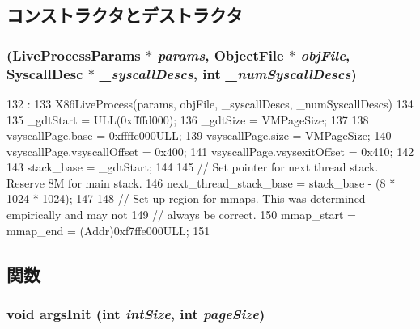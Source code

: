\subsection{コンストラクタとデストラクタ}
\hypertarget{classX86ISA_1_1I386LiveProcess_a6556f426be989188ef0a961836b3b490}{
\subsubsection[{I386LiveProcess}]{ (LiveProcessParams $\ast$ {\em params}, \/  {\bf ObjectFile} $\ast$ {\em objFile}, \/  {\bf SyscallDesc} $\ast$ {\em \_\-syscallDescs}, \/  int {\em \_\-numSyscallDescs})}}
\label{classX86ISA_1_1I386LiveProcess_a6556f426be989188ef0a961836b3b490}



\begin{DoxyCode}
132                               :
133     X86LiveProcess(params, objFile, _syscallDescs, _numSyscallDescs)
134 {
135     _gdtStart = ULL(0xffffd000);
136     _gdtSize = VMPageSize;
137 
138     vsyscallPage.base = 0xffffe000ULL;
139     vsyscallPage.size = VMPageSize;
140     vsyscallPage.vsyscallOffset = 0x400;
141     vsyscallPage.vsysexitOffset = 0x410;
142 
143     stack_base = _gdtStart;
144 
145     // Set pointer for next thread stack.  Reserve 8M for main stack.
146     next_thread_stack_base = stack_base - (8 * 1024 * 1024);
147 
148     // Set up region for mmaps. This was determined empirically and may not
149     // always be correct.
150     mmap_start = mmap_end = (Addr)0xf7ffe000ULL;
151 }

\end{DoxyCode}


\subsection{関数}
\hypertarget{classX86ISA_1_1I386LiveProcess_a60e5314ffeede1e51c6bcb2cf606ca92}{
\subsubsection[{argsInit}]{\setlength{\rightskip}{0pt plus 5cm}void argsInit (int {\em intSize}, \/  int {\em pageSize})}}
\label{classX86ISA_1_1I386LiveProcess_a60e5314ffeede1e51c6bcb2cf606ca92}



